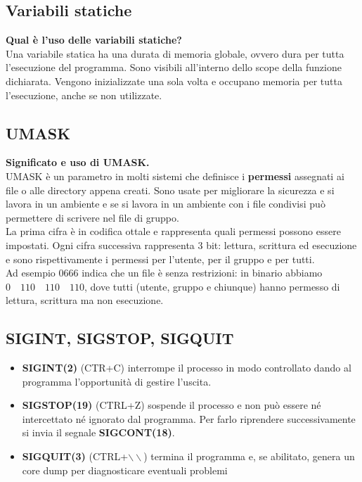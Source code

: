 \subsection{Variabili statiche}
\textbf{Qual è l'uso delle variabili statiche?}\\
Una variabile statica ha una durata di memoria globale, ovvero dura per tutta l'esecuzione del programma. Sono visibili all'interno dello scope della funzione dichiarata. Vengono inizializzate una sola volta e occupano memoria per tutta l'esecuzione, anche se non utilizzate.

\subsection{UMASK}
\textbf{Significato e uso di UMASK.}\\
UMASK è un parametro in molti sistemi che definisce i \textbf{permessi} assegnati ai file o alle directory appena creati. Sono usate per migliorare la sicurezza e si lavora in un ambiente e se si lavora in un ambiente con i file condivisi può permettere di scrivere nel file di gruppo.\\
La prima cifra è in codifica ottale e rappresenta quali permessi possono essere impostati. Ogni cifra successiva rappresenta $3$ bit: lettura, scrittura ed esecuzione e sono rispettivamente i permessi per l'utente, per il gruppo e per tutti.\\
Ad esempio $0666$ indica che un file è senza restrizioni: in binario abbiamo $0 \quad 110 \quad 110 \quad 110$, dove tutti (utente, gruppo e chiunque) hanno permesso di lettura, scrittura ma non esecuzione.

\subsection{SIGINT, SIGSTOP, SIGQUIT}
\begin{itemize}
	\item \textbf{SIGINT(2)} (CTR+C) interrompe il processo in modo controllato dando al programma l'opportunità di gestire l'uscita.
	\item \textbf{SIGSTOP(19)} (CTRL+Z) sospende il processo e non può essere né intercettato né ignorato dal programma. Per farlo riprendere successivamente si invia il segnale \textbf{SIGCONT(18)}.
	\item \textbf{SIGQUIT(3)} (CTRL+$\backslash\backslash$) termina il programma e, se abilitato, genera un core dump per diagnosticare eventuali problemi
\end{itemize}

